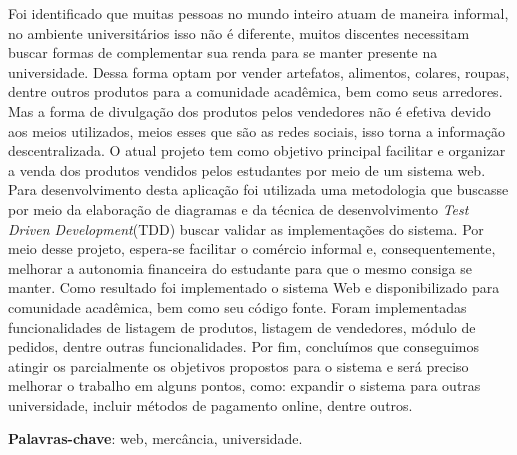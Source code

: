 
\setlength{\absparsep}{18pt} %
\begin{resumo}
Foi identificado que muitas pessoas no mundo inteiro atuam de maneira informal, no ambiente universitários isso não é diferente, muitos discentes necessitam buscar formas de complementar sua renda para se manter presente na universidade. Dessa forma optam por vender artefatos, alimentos, colares, roupas, dentre outros produtos para a comunidade acadêmica, bem como seus arredores. Mas a forma de divulgação dos produtos pelos vendedores não é efetiva devido aos meios utilizados, meios esses que são as redes sociais, isso torna a informação descentralizada. O atual projeto tem como objetivo principal facilitar e organizar a venda dos produtos vendidos pelos estudantes por meio de um sistema web. Para desenvolvimento desta aplicação foi utilizada uma metodologia que buscasse por meio da elaboração de diagramas e da técnica de desenvolvimento \textit{Test Driven Development}(TDD) buscar validar as implementações do sistema. Por meio desse projeto, espera-se facilitar o comércio informal e, consequentemente, melhorar a autonomia financeira do estudante para que o mesmo consiga se manter. Como resultado foi implementado o sistema Web e disponibilizado para comunidade acadêmica, bem como seu código fonte. Foram implementadas funcionalidades de listagem de produtos, listagem de vendedores, módulo de pedidos, dentre outras funcionalidades. Por fim, concluímos que conseguimos atingir os parcialmente os objetivos propostos para o sistema e será preciso melhorar o trabalho em alguns pontos, como: expandir o sistema para outras universidade, incluir métodos de pagamento online, dentre outros.


 \textbf{Palavras-chave}: web, mercância, universidade.
\end{resumo}


 

% 
%
%  
